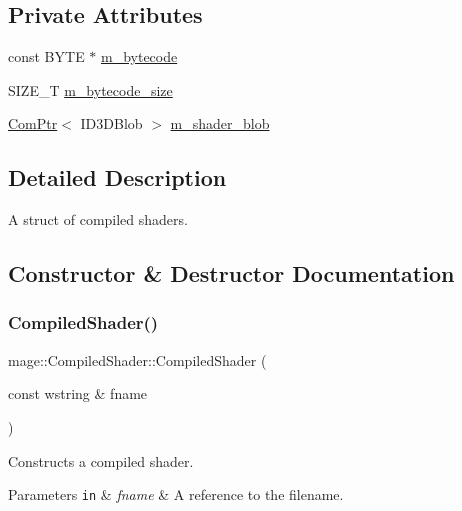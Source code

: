 \subsection*{Private Attributes}
\begin{DoxyCompactItemize}
\item 
const B\+Y\+TE $\ast$ \hyperlink{structmage_1_1_compiled_shader_af4b0b541b5a2fb5c527242b8ed35f489}{m\+\_\+bytecode}
\item 
S\+I\+Z\+E\+\_\+T \hyperlink{structmage_1_1_compiled_shader_a0c1217abcfd049bf57cb1570126a8d04}{m\+\_\+bytecode\+\_\+size}
\item 
\hyperlink{namespacemage_ae74f374780900893caa5555d1031fd79}{Com\+Ptr}$<$ I\+D3\+D\+Blob $>$ \hyperlink{structmage_1_1_compiled_shader_aaa931468123884bbed243e2f5487f35a}{m\+\_\+shader\+\_\+blob}
\end{DoxyCompactItemize}


\subsection{Detailed Description}
A struct of compiled shaders. 

\subsection{Constructor \& Destructor Documentation}
\hypertarget{structmage_1_1_compiled_shader_a64f6fea62d53c76a9ff01defc3c3c5ba}{}\label{structmage_1_1_compiled_shader_a64f6fea62d53c76a9ff01defc3c3c5ba} 
\subsubsection{\texorpdfstring{Compiled\+Shader()}{CompiledShader()}\hspace{0.1cm}{\footnotesize\ttfamily [1/4]}}
{\footnotesize\ttfamily mage\+::\+Compiled\+Shader\+::\+Compiled\+Shader (\begin{DoxyParamCaption}\item[{const wstring \&}]{fname }\end{DoxyParamCaption})\hspace{0.3cm}{\ttfamily [explicit]}}

Constructs a compiled shader.


\begin{DoxyParams}[1]{Parameters}
\mbox{\tt in}  & {\em fname} & A reference to the filename. \\
\hline
\end{DoxyParams}


